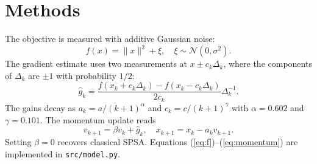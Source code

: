 \section{Methods}\label{sec:methods}
The objective is measured with additive Gaussian noise:
\begin{equation}\label{eq:f}
f(x) = \|x\|^2 + \xi, \quad \xi \sim \mathcal{N}(0, \sigma^2).
\end{equation}
The gradient estimate uses two measurements at $x \pm c_k \Delta_k$, where the components of
$\Delta_k$ are $\pm 1$ with probability $1/2$:
\begin{equation}\label{eq:grad}
\hat g_k = \frac{f(x_k + c_k \Delta_k) - f(x_k - c_k \Delta_k)}{2 c_k} \Delta_k^{-1}.
\end{equation}
The gains decay as $a_k = a/(k+1)^{\alpha}$ and $c_k = c/(k+1)^{\gamma}$ with
$\alpha = 0.602$ and $\gamma = 0.101$.
The momentum update reads
\begin{equation}\label{eq:momentum}
v_{k+1} = \beta v_k + \hat g_k, \quad x_{k+1} = x_k - a_k v_{k+1}.
\end{equation}
Setting $\beta = 0$ recovers classical SPSA.
Equations (\ref{eq:f})--(\ref{eq:momentum}) are implemented in \texttt{src/model.py}.
